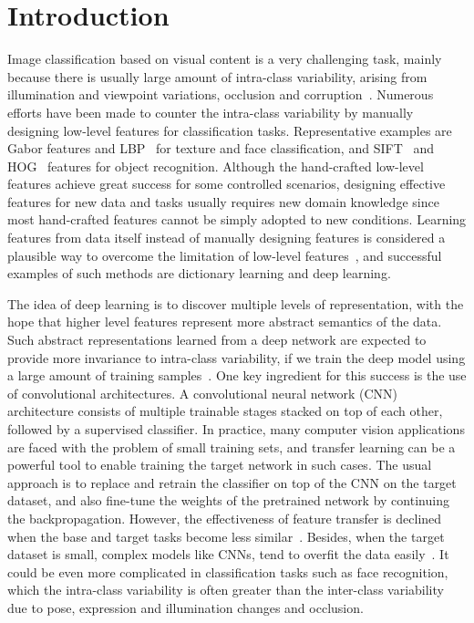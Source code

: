 \documentclass[journal]{IEEEtran}
\begin{document}
\section{Introduction}
\label{sec:intro}
Image classification based on visual content is a very challenging task, mainly because there is usually large amount of intra-class variability, arising from illumination and viewpoint variations, occlusion and corruption~\cite{PCA-Net}. Numerous efforts have been made to counter the intra-class variability by manually designing low-level features for classification tasks. Representative examples are Gabor features and LBP~\cite{LBP} for texture and face classification, and SIFT~\cite{SIFT} and HOG~\cite{HOG} features for object recognition. Although the hand-crafted low-level features achieve great success for some controlled scenarios, designing effective features for new data and tasks usually requires new domain knowledge since most hand-crafted features cannot be simply adopted to new conditions. Learning features from data itself instead of manually designing features is considered a plausible way to overcome the limitation of low-level features~\cite{PCA-Net}, and successful examples of such methods are dictionary learning and deep learning. 

The idea of deep learning is to discover multiple levels of representation, with the hope that higher level features represent more abstract semantics of the data. Such abstract representations learned from a deep network are expected to provide more invariance to intra-class variability, if we train the deep model using a large amount of training samples~\cite{PCA-Net}. One key ingredient for this success is the use of convolutional architectures. A convolutional neural network (CNN) architecture consists of multiple trainable stages stacked on top of each other, followed by a supervised classifier. In practice, many computer vision applications are faced with the problem of small training sets, and transfer learning can be a powerful tool to enable training the target network in such cases. The usual approach is to replace and retrain the classifier on top of the CNN on the target dataset, and also fine-tune the weights of the pretrained network by continuing the backpropagation. However, the effectiveness of feature transfer is declined when the base and target tasks become less similar~\cite{Transferable}. Besides, when the target dataset is small, complex models like CNNs, tend to overfit the data easily~\cite{Transferable}. It could be even more complicated in classification tasks such as face recognition, which the intra-class variability is often greater than the inter-class variability due to pose, expression and illumination changes and occlusion.
\end{document}
